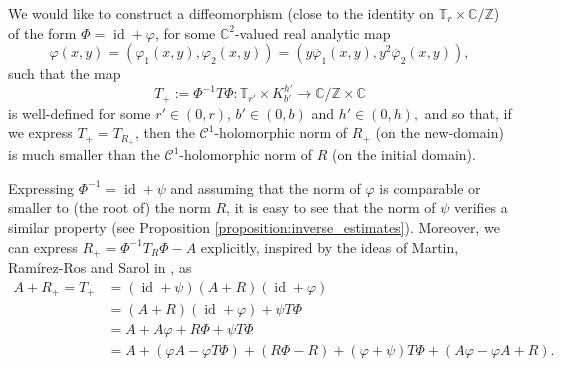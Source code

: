 \documentclass[10pt]{article}
\DeclareMathOperator{\id}{id}
\newcommand{\Z}{\mathbb{Z}}
\newcommand{\C}{\mathbb{C}}
\newcommand{\T}{\mathbb{T}}
\begin{document}
We would like to construct a diffeomorphism (close to the identity on $\T_r \times \C/\Z$) of the form $\Phi=\id +\varphi$, for some $\C^2$-valued real analytic map 
\begin{equation}
\label{eq:varphi_form}
\varphi(x, y) = (\varphi_1(x, y), \varphi_2(x, y)) = (y\overline\varphi_1(x, y), y^2\overline\varphi_2(x, y)),
\end{equation}
such that the map 
\[
T_+ := \Phi^{-1}T\Phi:\T_{r'}\times K_{b'}^{h'}\to \C/\Z \times \C
\]
is well-defined for some $r'\in(0,r)$, $b'\in(0,b)$ and $h'\in(0,h),$ and so that, if we express $T_+ = T_{R_+}$, then the $\mathscr{C}^1$-holomorphic norm of $R_+$ (on the new-domain) is much smaller than the $\mathscr{C}^1$-holomorphic  norm of $R$ (on the initial domain).

Expressing $\Phi^{-1} = \id + \psi$ and assuming that the norm of $\varphi$ is comparable or smaller to (the root of) the norm $R$, it is easy to see that the norm of $\psi$ verifies a similar property (see Proposition \ref{proposition:inverse_estimates}). Moreover, we can express $R_+ = \Phi^{-1}T_R\Phi - A$ explicitly, inspired by the ideas of Martin, Ram\'irez-Ros and Sarol in \cite{MartinRamirezTamarit}, as
\begin{align*}
A + R_+ = T_+ & = (\id + \psi ) (A + R)  (\id + \varphi) \\
& = (A + R)(\id + \varphi) + \psi T\Phi \\
& =A + A \varphi + R\Phi + \psi T \Phi \\
& = A + (\varphi A - \varphi T\Phi) + (R\Phi - R) + (\varphi + \psi)T \Phi + (A\varphi - \varphi A+R).
\end{align*}
\end{document}
